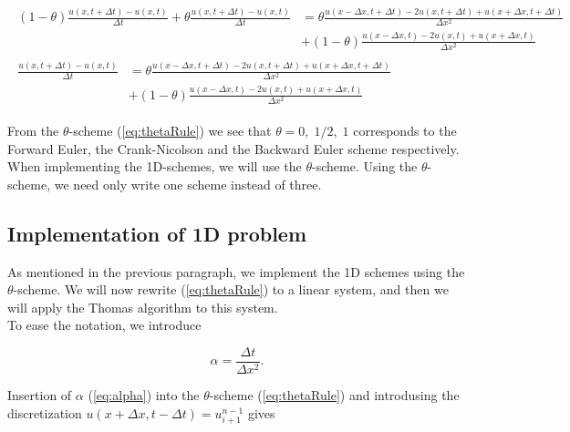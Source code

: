 \documentclass{article}
\begin{document}
\begin{subequations}
	\begin{align}
		\begin{split}
			(1-\theta) 	\frac{u(x,t+\Delta t) - u(x,t)}{\Delta t} + \theta 	\frac{u(x,t+\Delta t) - u(x,t)}{\Delta t}&=  \theta \frac{u(x-\Delta x,t+ \Delta t)
				- 2u(x,t+\Delta t) +u(x+\Delta x,t+\Delta t)}{\Delta x^2} \\
			&+ (1 - \theta) \frac{u(x-\Delta x,t) - 2u(x,t) +u(x+ \Delta x,t)}{\Delta x^2} 
		\end{split}\\
		\begin{split}
			\frac{u(x,t+\Delta t) - u(x,t)}{\Delta t}&= 
			  \theta \frac{u(x-\Delta x,t+ \Delta t)
				- 2u(x,t+\Delta t) +u(x+\Delta x,t+\Delta t)}{\Delta x^2} \\
			&+ (1 - \theta) \frac{u(x-\Delta x,t) - 2u(x,t) +u(x+ \Delta x,t)}{\Delta x^2} 
			\end{split}\label{eq:thetaRule}
	\end{align}
\end{subequations}

From the $\theta$-scheme (\ref{eq:thetaRule}) we see that $\theta = 0,\;1/2,\;1$ corresponds to the Forward Euler, the Crank-Nicolson and the Backward Euler scheme respectively.\\

When implementing the 1D-schemes, we will use the $\theta$-scheme. Using the $\theta$-scheme, we need only write one scheme instead of three.

\subsection{Implementation of 1D problem}
As mentioned in the previous paragraph, we implement the 1D schemes using the $\theta$-scheme. We will now rewrite (\ref{eq:thetaRule}) to a linear system, and then we will apply the Thomas algorithm to this system.\\

To ease the notation, we introduce 

\begin{equation}\label{eq:alpha}
	\alpha = \frac{\Delta t}{\Delta x^2}.
\end{equation}

Insertion of $\alpha$ (\ref{eq:alpha}) into the $\theta$-scheme (\ref{eq:thetaRule}) and introdusing the discretization $u(x + \Delta x, t - \Delta t) = u_{i+1}^{n-1}$ gives
\end{document}
